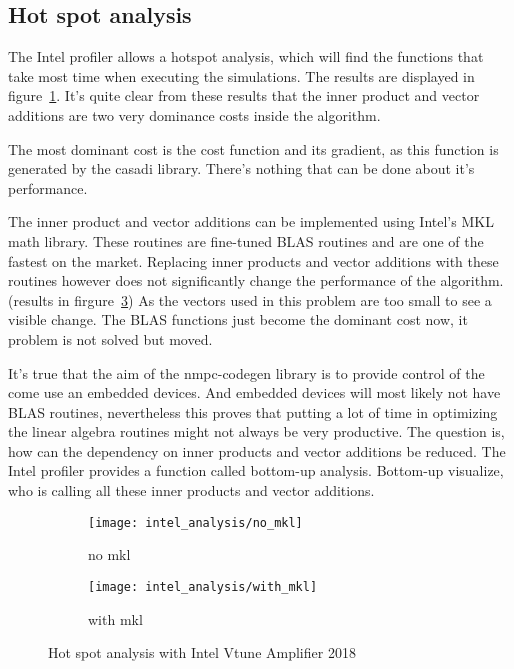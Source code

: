 \subsection{Hot spot analysis}
The Intel profiler allows a hotspot analysis, which will find the functions that take most time when executing the simulations. The results are displayed in figure~\ref{fig:hotspot no mkl}.  It's quite clear from these results that the inner product and vector additions are two very dominance costs inside the algorithm.

The most dominant cost is the cost function and its gradient, as this function is generated by the casadi library. There's nothing that can be done about it's performance.

The inner product and vector additions can be implemented using Intel's MKL math library. These routines are fine-tuned BLAS routines and are one of the fastest on the market. Replacing inner products and vector additions with these routines however does not significantly change the performance of the algorithm.(results in firgure~\ref{fig:hotspot with mkl}) As the vectors used in this problem are too small to see a visible change. The BLAS functions just become the dominant cost now, it problem is not solved but moved.

It's true that the aim of the nmpc-codegen library is to provide control of the come use an embedded devices. And embedded devices will most likely not have BLAS routines, nevertheless this proves that putting a lot of time in optimizing the linear algebra routines might not always be very productive. The question is, how can the dependency on inner products and vector additions be reduced. The Intel profiler provides a function called bottom-up analysis. Bottom-up visualize, who is calling all these inner products and vector additions.

\begin{figure}[H]
	\centering
	\begin{subfigure}[b]{0.45\textwidth}
		\centering
		\texttt{[image: intel\_analysis/no\_mkl]}
		\caption{no mkl}
		\label{fig:hotspot no mkl}
	\end{subfigure}
	\hfill
	\begin{subfigure}[b]{0.45\textwidth}
		\centering
		\texttt{[image: intel\_analysis/with\_mkl]}
		\caption{with mkl}
		\label{fig:hotspot with mkl}
	\end{subfigure}
	\caption{Hot spot analysis with Intel Vtune Amplifier 2018}
\end{figure}

